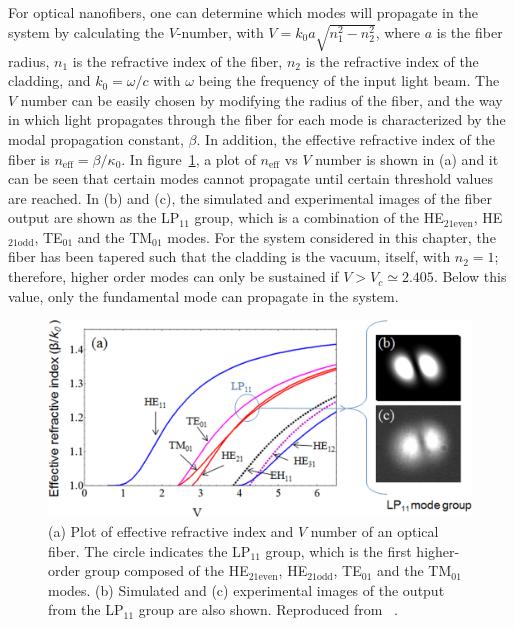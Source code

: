For optical nanofibers, one can determine which modes will propagate in the system by calculating the $V$-number, with $V = k_0a\sqrt{n_1^2 - n_2^2}$, where $a$ is the fiber radius, $n_1$ is the refractive index of the fiber, $n_2$ is the refractive index of the cladding, and $k_0 = \omega/c$ with $\omega$ being the frequency of the input light beam.
The $V$ number can be easily chosen by modifying the radius of the fiber, and the way in which light propagates through the fiber for each mode is characterized by the modal propagation constant, $\beta$.
In addition, the effective refractive index of the fiber is $n_\text{eff} = \beta / \kappa_0$.
In figure~\ref{fig:mode_plot}, a plot of $n_\text{eff}$ vs $V$ number is shown in (a) and it can be seen that certain modes cannot propagate until certain threshold values are reached.
In (b) and (c), the simulated and experimental images of the fiber output are shown as the LP$_{11}$ group, which is a combination of the HE$_{21\text{even}}$, HE$_{21\text{odd}}$, TE$_{01}$ and the TM$_{01}$ modes.
For the system considered in this chapter, the fiber has been tapered such that the cladding is the vacuum, itself, with $n_2=1$; therefore, higher order modes can only be sustained if $V > V_c \simeq 2.405$.
Below this value, only the fundamental mode can propagate in the system.

\begin{figure}

\center \includegraphics[width=\textwidth]{data/3d/fiber/mode_plot.jpg}
\caption{(a) Plot of effective refractive index and $V$ number of an optical fiber.
The circle indicates the LP$_{11}$ group, which is the first higher-order group composed of the HE$_{21\text{even}}$, HE$_{21\text{odd}}$, TE$_{01}$ and the TM$_{01}$ modes.
(b) Simulated and (c) experimental images of the output from the LP$_{11}$ group are also shown.
Reproduced from ~\cite{nieddu2016, kumar2015}.
}
\label{fig:mode_plot}
\end{figure}

